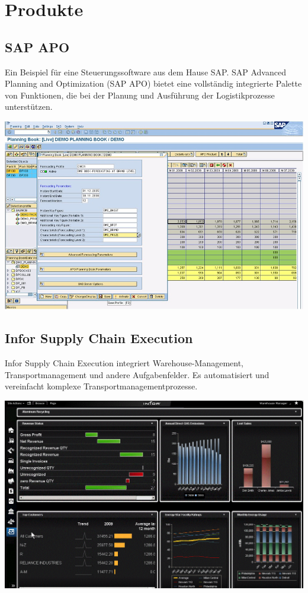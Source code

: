 \documentclass[a4paper,12pt]{scrreprt}
\begin{document}
	\chapter{Produkte}
	\section{SAP APO}
		Ein Beispiel für eine Steuerungssoftware aus dem Hause SAP. SAP Advanced Planning and Optimization (SAP APO) bietet eine vollständig integrierte Palette von Funktionen, die bei der Planung und Ausführung der Logistikprozesse unterstützen.
		\begin{center}
		\includegraphics[width=0.7\linewidth]{./Bilder/sas-forecast-SAP-3-full}
		\end{center}


		
	\section{Infor Supply Chain Execution}
		Infor Supply Chain Execution integriert Warehouse-Management, Transportmanagement und andere Aufgabenfelder. Es automatisiert und vereinfacht komplexe Transportmanagementprozesse. 
		\begin{center}
\includegraphics[width=0.7\linewidth]{./Bilder/execution-screenshot1}
\end{center}
\end{document}
